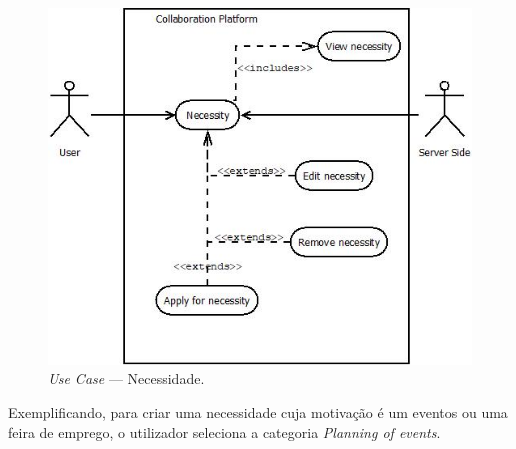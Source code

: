 \begin{figure}[H]
    \centering
    \includegraphics[scale=0.6]{figures/Necessity.jpeg}
    \caption{\textit{Use Case} --- Necessidade.}\label{fig:uc:necessity}
\end{figure}

Exemplificando, para criar uma necessidade cuja motivação é um eventos ou uma feira de emprego, o utilizador seleciona a categoria \textit{Planning of events}.

